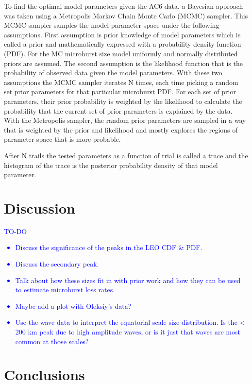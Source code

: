 \documentclass[draft]{agujournal2019}
\begin{document}
To find the optimal model parameters given the AC6 data, a Bayesian approach was taken using a Metropolis Markov Chain Monte Carlo (MCMC) sampler. This MCMC sampler samples the model parameter space under the following assumptions. First assumption is prior knowledge of model parameters which is called a prior and mathematically expressed with a probability density function (PDF). For the MC microburst size model uniformly and normally distributed priors are assumed. The second assumption is the likelihood function that is the probability of observed data given the model parameters. With these two assumptions the MCMC sampler iterates N times, each time picking a random set prior parameters for that particular microburst PDF. For each set of prior parameters, their prior probability is weighted by the likelihood to calculate the probability that the current set of prior parameters is explained by the data. With the Metropolis sampler, the random prior parameters are sampled in a way that is weighted by the prior and likelihood and mostly explores the regions of parameter space that is more probable.

After N trails the tested parameters as a function of trial is called a trace and the histogram of the trace is the posterior probability density of that model parameter. 

\section{Discussion}
\textcolor{blue}{
TO-DO
\begin{itemize}
\item Discuss the significance of the peaks in the LEO CDF \& PDF.
\item Discuss the secondary peak.
\item Talk about how these sizes fit in with prior work and how they can be used to estimate microburst loss rates.
\item Maybe add a plot with Oleksiy's data?
\item Use the wave data to interpret the equatorial scale size distribution. Is the < 200 km peak due to high amplitude waves, or is it just that waves are most common at those scales?
\end{itemize}
}

\section{Conclusions}

\end{document}
